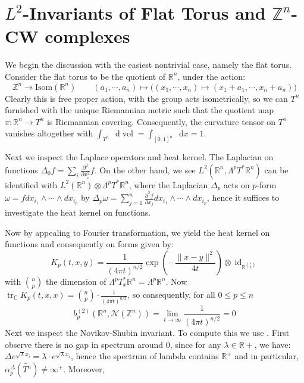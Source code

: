 \documentclass[11pt]{report}
\theoremstyle{definition}
\theoremstyle{plain}
\DeclareMathOperator{\tr}{tr}
\DeclareMathOperator{\id}{id}
\DeclareMathOperator{\vol}{vol}
\newcommand{\real}{\mathbb{R}}
\newcommand{\complex}{\mathbb{C}}
\newcommand{\integer}{\mathbb{Z}}
\newcommand{\vna}{\mathcal{N}}
\newcommand{\diff}[2]{\frac{\partial #1}{\partial #2}}
\newcommand{\norm}[1]{\lVert #1 \rVert}
\renewcommand{\tilde}{\widetilde}
\newcommand{\mass}[1]{\mathop{}\mathrm{d}{#1}}
\begin{document}
\section{$L^2$-Invariants of Flat Torus and $\integer^n$-CW complexes}
We begin the discussion with the easiest nontrivial case, namely the flat torus. Consider the flat torus to be the quotient of $\real^n$, under the action:
\begin{equation}
\integer^n \longrightarrow \mathrm{Isom}(\real^n) \qquad (a_1, \cdots, a_n)\mapsto \Big((x_1, \cdots, x_n)\mapsto (x_1+a_1, \cdots, x_n+a_n)\Big)
\end{equation}
Clearly this is free proper action, with the group acts isometrically, so we can $T^n$ furnished with the unique Riemannian metric such that  the quotient map $\pi: \real^n\to T^n$ is Riemannian covering. Consequently, the curvature tensor on $T^n$ vanishes altogether with $\int_{T^n}\mass{\vol}=\int_{[0,1]^n}\mass{x}=1$.
\par Next we inspect the Laplace operators and heat kernel. The Laplacian on functions $\Delta_0f=\sum_i\diff{^2}{x_i^2}f$. On the other hand, we see $L^2(\real^n, \Lambda^pT^*\real^n)$ can be identified with $L^2(\real^n)\otimes \Lambda^pT^*\real^n$, where the Laplacian $\Delta_p$ acts on $p$-form $\omega=f dx_{i_1}\wedge \cdots \wedge dx_{i_p}$ by $\Delta_p\omega=\sum_{j=1}^n\diff{^2f}{x_j} dx_{i_1}\wedge \cdots \wedge dx_{i_p}$, hence it suffices to investigate the heat kernel on functions. 
\par Now by appealing to Fourier transformation, we yield the heat kernel on functions and consequently on forms given by:
\begin{equation}
K_p(t, x,y)=\frac{1}{(4\pi t)^{n/2}}\exp(-\frac{\norm{x-y}^2}{4t})\otimes \id_{\real^{n \choose p}}
\end{equation}
with ${n \choose p}$ the dimension of $\Lambda^p T_x^*\real^n=\Lambda^p \real^n$. Now $\tr_\complex K_p(t,x, x)={n \choose p}\cdot \frac{1}{(4\pi t)^{n/2}}$, so consequently, for all $0\leq p\leq n$
\begin{equation}
b_p^{(2)}(\real^n, \vna(\integer^n))=\lim_{t\to \infty}\frac{1}{(4\pi t)^{n/2}}=0
\end{equation}
Next we inspect the Novikov-Shubin invariant. To compute this we use . First observe there is no gap in spectrum around $0$, since for any $\lambda\in \real+$, we have: $\Delta e^{\sqrt{\lambda}x_i}=\lambda\cdot e^{\sqrt{\lambda}x_i}$, hence the spectrum of lambda contains $\real^+$ and in particular, $\alpha^\Delta_p(\tilde{T^n})\neq \infty^+$. Moreover, 
\end{document}
